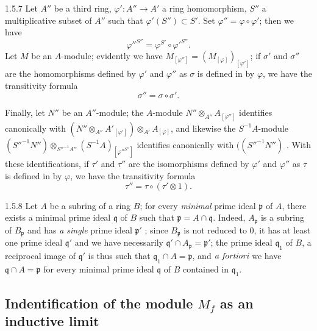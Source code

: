\documentclass{book}
\begin{document}
\begin{env}{1.5.7}
\label{env-0.1.5.7}
Let $A''$ be a third ring, $\varphi'\colon A''\to A'$ a ring homomorphism,
$S''$ a multiplicative subset of $A''$ such that $\varphi'(S'')\subset S'$. Set
$\varphi''=\varphi\circ\varphi'$; then we have
\[
  {\varphi''}^{S''}=\varphi^{S'}\circ{\varphi'}^{S''}.
\]
Let $M$ be an $A$-module; evidently we have $M_{[\varphi'']}=(M_{[\varphi]})_{[\varphi']}$;
if $\sigma'$ and $\sigma''$ are the homomorphisms defined by $\varphi'$ and $\varphi''$ as
$\sigma$ is defined in  by $\varphi$, we have the transitivity formula
\[
  \sigma''=\sigma\circ\sigma'.
\]

Finally, let $N''$ be an $A''$-module; the $A$-module $N''\otimes_{A''}A_{[\varphi'']}$
identifies canonically with
$(N''\otimes_{A''}{A'}_{[\varphi']})\otimes_{A'}A_{[\varphi]}$,
and likewise the $S^{-1}A$-module
${({S''}^{-1}N'')\otimes_{{S''}^{-1}A''}(S^{-1}A)_{[{\varphi''}^{S''}]}}$ identifies
canonically with
$(({S''}^{-1}N'')$ . With these identifications, if $\tau'$
and $\tau''$ are the isomorphisms defined by $\varphi'$ and $\varphi''$ as $\tau$ is defined
in  by $\varphi$, we have the transitivity formula
\[
  \tau''=\tau\circ(\tau'\otimes 1).
\]
\end{env}

\begin{env}{1.5.8}
\label{env-0.1.5.8}
Let $A$ be a subring of a ring $B$; for every \emph{minimal} prime ideal $\mathfrak{p}$ of $A$, there
exists a minimal prime ideal $\mathfrak{q}$ of $B$ such that $\mathfrak{p}=A\cap\mathfrak{q}$. Indeed, $A_\mathfrak{p}$
is a subring of $B_\mathfrak{p}$  and has \emph{a single} prime ideal $\mathfrak{p}'$ ; since
$B_\mathfrak{p}$ is not reduced to $0$, it has at least one prime ideal $\mathfrak{q}'$ and we have
necessarily $\mathfrak{q}'\cap A_\mathfrak{p}=\mathfrak{p}'$; the prime ideal $\mathfrak{q}_1$ of $B$, a reciprocal image
of $\mathfrak{q}'$ is thus such that $\mathfrak{q}_1\cap A=\mathfrak{p}$, and $\emph{a fortiori}$ we have
$\mathfrak{q}\cap A=\mathfrak{p}$ for every minimal prime ideal $\mathfrak{q}$ of $B$ contained in $\mathfrak{q}_1$.
\end{env}

\subsection{Indentification of the module $M_f$ as an inductive limit}
\label{0-prelim-1.6}
\end{document}
